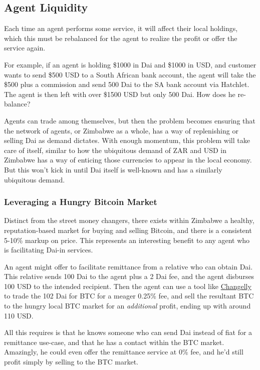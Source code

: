 \documentclass{article}
\begin{document}
\subsection{Agent Liquidity} \label{liquidity}

Each time an agent performs some service, it will affect their local holdings, which this must be rebalanced for the agent to realize the profit or offer the service again.

For example, if an agent is holding \$1000 in Dai and \$1000 in USD, and customer wants to send \$500 USD to a South African bank account, the agent will take the \$500 plus a commission and send 500 Dai to the SA bank account via Hatchlet. The agent is then left with over \$1500 USD but only 500 Dai. How does he re-balance?

Agents can trade among themselves, but then the problem becomes ensuring that the network of agents, or Zimbabwe as a whole, has a way of replenishing or selling Dai as demand dictates. With enough momentum, this problem will take care of itself, similar to how the ubiquitous demand of ZAR and USD in Zimbabwe has a way of enticing those currencies to appear in the local economy. But this won't kick in until Dai itself is well-known and has a similarly ubiquitous demand.

\subsubsection{Leveraging a Hungry Bitcoin Market} \label{bitcoin liquidity}

Distinct from the street money changers, there exists within Zimbabwe a healthy, reputation-based market for buying and selling Bitcoin, and there is a consistent 5-10\% markup on price. This represents an interesting benefit to any agent who is facilitating Dai-in services.

An agent might offer to facilitate remittance from a relative who can obtain Dai. This relative sends 100 Dai to the agent plus a 2 Dai fee, and the agent disburses 100 USD to the intended recipient. Then the agent can use a tool like \href{https://changelly.com/}{Changelly} to trade the 102 Dai for BTC for a meager 0.25\% fee, and sell the resultant BTC to the hungry local BTC market for an \textit{additional} profit, ending up with around 110 USD.

All this requires is that he knows someone who can send Dai instead of fiat for a remittance use-case, and that he has a contact within the BTC market. Amazingly, he could even offer the remittance service at 0\% fee, and he'd still profit simply by selling to the BTC market.
\end{document}
